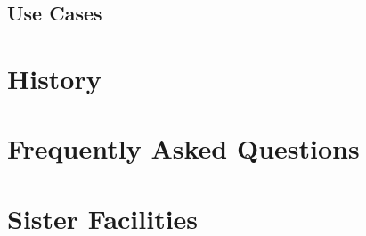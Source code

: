 \documentclass{easychair}
\begin{document}
\subsection{Use Cases}
\label{sect:cases}


\appendix
\section{History}
\label{sect:history}


\section{Frequently Asked Questions}
\label{sect:faqs}


\section{Sister Facilities}
\label{sect:sister-facilities}


\nocite{aosa-book-vol1}
\label{sect:bib}
%

%
%
%
\clearpage
{} 


\end{document}
